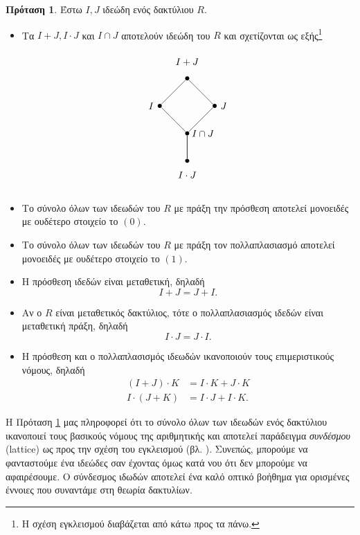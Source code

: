 \documentclass[12pt,a4paper,reqno]{amsart}
\theoremstyle{definition}
\newtheorem{proposition}[theorem]{Πρόταση}
\theoremstyle{remark}
\numberwithin{theorem}{section}
\numberwithin{exercise}{section}
\numberwithin{equation}{section}
\begin{document}
\begin{proposition}
    \label{prop:ideals}
    Έστω $Ι, J$ ιδεώδη ενός δακτύλιου $R$.
    \begin{itemize}
        \item Τα $I+J, I\cdot J$ και $I\cap{J}$ αποτελούν ιδεώδη του $R$ και σχετίζονται ως εξής\footnote{Η σχέση εγκλεισμού διαβάζεται από κάτω προς τα πάνω.}
        \[
        \begin{tikzpicture}[every node/.style={circle, fill, inner sep=1.5pt}]
            \begin{scope}[shift={(0,0)}]
                \node[label=above:{$I+J$}] (plus) at (1,1) {};
                \node[label=left:{$I$}] (I) at (0,0) {};
                \node[label=right:{$J$}] (J) at (2,0) {};
                \node[label=right:{$I\cap{J}$}] (cap) at (1,-1) {};
                \node[label=below:{$I\cdot J$}] (times) at (1,-2) {};

                \draw (plus) -- (I) -- (cap) -- (times);
                \draw (plus) -- (J) -- (cap) -- (times);
            \end{scope}
        \end{tikzpicture}
        \]

        \item Το σύνολο όλων των ιδεωδών του $R$ με πράξη την πρόσθεση αποτελεί μονοειδές με ουδέτερο στοιχείο το $(0)$.
        \item Το σύνολο όλων των ιδεωδών του $R$ με πράξη τον πολλαπλασιασμό αποτελεί μονοειδές με ουδέτερο στοιχείο το $(1)$.
        \item Η πρόσθεση ιδεδών είναι μεταθετική, δηλαδή 
        \[
        I + J = J + I.
        \]
        \item Αν ο $R$ είναι μεταθετικός δακτύλιος, τότε ο πολλαπλασιασμός ιδεδών είναι μεταθετική πράξη, δηλαδή
        \[
        I\cdot{J} = J\cdot{I}.
        \]
        \item Η πρόσθεση και ο πολλαπλασισμός ιδεωδών ικανοποιούν τους επιμεριστικούς νόμους, δηλαδή 
        \begin{align*}
        (I + J)\cdot{K} &= I\cdot{K} + J\cdot{K} \\
        I\cdot (J+K) &= I\cdot{J} + I\cdot{K}.
        \end{align*}
    \end{itemize}
\end{proposition}

Η Πρόταση \ref{prop:ideals} μας πληροφορεί ότι το σύνολο όλων των ιδεωδών ενός δακτύλιου ικανοποιεί τους βασικούς νόμους της αριθμητικής και αποτελεί παράδειγμα \emph{συνδέσμου} (lattice) ως προς την σχέση του εγκλεισμού (βλ. \cite[Ορισμός~1.1.4]{Mpe15}). Συνεπώς, μπορούμε να φανταστούμε ένα ιδεώδες σαν  έχοντας όμως κατά νου ότι δεν μπορούμε να αφαιρέσουμε. Ο σύνδεσμος ιδωδών αποτελεί ένα καλό οπτικό βοήθημα για ορισμένες έννοιες που συναντάμε στη θεωρία δακτυλίων.
\end{document}
